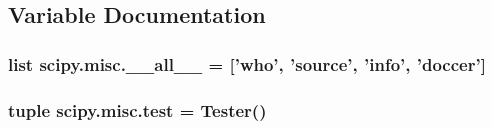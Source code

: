 \subsection{Variable Documentation}
\hypertarget{namespacescipy_1_1misc_a6aecc429c8e40542d00cf5677ae15521}{}
\subsubsection[{\+\_\+\+\_\+all\+\_\+\+\_\+}]{\setlength{\rightskip}{0pt plus 5cm}list scipy.\+misc.\+\_\+\+\_\+all\+\_\+\+\_\+ = \mbox{[}'who', 'source', '{\bf info}', 'doccer'\mbox{]}}\label{namespacescipy_1_1misc_a6aecc429c8e40542d00cf5677ae15521}
\hypertarget{namespacescipy_1_1misc_a21545251e17588983d91eb63e3b9d306}{}
\subsubsection[{test}]{\setlength{\rightskip}{0pt plus 5cm}tuple scipy.\+misc.\+test = Tester()}\label{namespacescipy_1_1misc_a21545251e17588983d91eb63e3b9d306}
